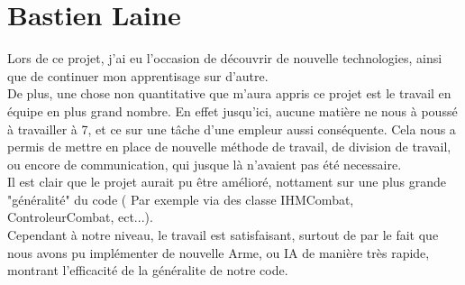     \section{Bastien Laine}
        Lors de ce projet, j'ai eu l'occasion de découvrir de nouvelle technologies, ainsi que de continuer mon apprentisage sur d'autre. \\
        De plus, une chose non quantitative que m'aura appris ce projet est le travail en équipe en plus grand nombre. En effet jusqu'ici, aucune matière ne nous à poussé à travailler à 7, et ce sur une tâche d'une empleur aussi conséquente. Cela nous a permis de mettre en place de nouvelle méthode de travail, de division de travail, ou encore de communication, qui jusque là n'avaient pas été necessaire. \\
        Il est clair que le projet aurait pu être amélioré, nottament sur une plus grande "généralité" du code ( Par exemple via des classe IHMCombat, ControleurCombat, ect...). \\
        Cependant à notre niveau, le travail est satisfaisant, surtout de par le fait que nous avons pu implémenter de nouvelle Arme, ou IA de manière très rapide, montrant l'efficacité de la généralite de notre code.
